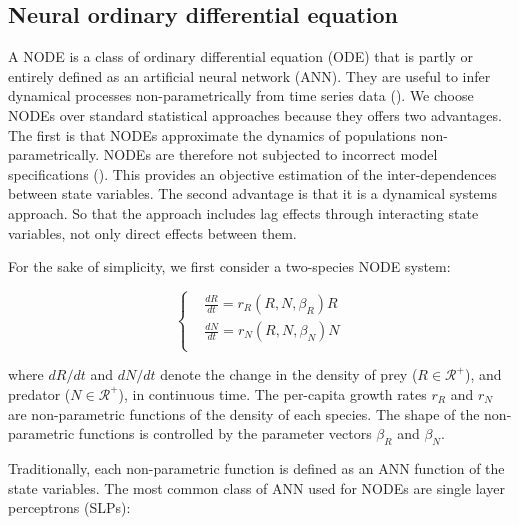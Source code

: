 \documentclass[11pt, oneside]{article}
\begin{document}

\subsection{Neural ordinary differential equation}

A NODE is a class of ordinary differential equation (ODE) that is partly or entirely defined as an artificial neural network (ANN).
They are useful to infer dynamical processes non-parametrically from time series data (\cite{Bonnaffe2021a}).
We choose NODEs over standard statistical approaches because they offers two advantages. 
The first is that NODEs approximate the dynamics of populations non-parametrically.
NODEs are therefore not subjected to incorrect model specifications (\cite{Jost2000,Adamson2013}).
This provides an objective estimation of the inter-dependences between state variables. 
The second advantage is that it is a dynamical systems approach. 
So that the approach includes lag effects through interacting state variables, not only direct effects between them. 

For the sake of simplicity, we first consider a two-species NODE system: 

\begin{equation} \left \{ \begin{aligned}
	& \frac{dR}{dt} = r_R(R,N,\beta_R) R \\
	& \frac{dN}{dt} = r_N(R,N,\beta_N) N \\
\end{aligned} \right . \end{equation}

where $dR/dt$ and $dN/dt$ denote the change in the density of prey ($R \in \mathcal{R}^+$), and predator ($N \in \mathcal{R}^+$), in continuous time.
The per-capita growth rates $r_R$ and $r_N$ are non-parametric functions of the density of each species.
The shape of the non-parametric functions is controlled by the parameter vectors $\beta_R$ and $\beta_N$.

Traditionally, each non-parametric function is defined as an ANN function of the state variables.
The most common class of ANN used for NODEs are single layer perceptrons (SLPs): 
\end{document}
